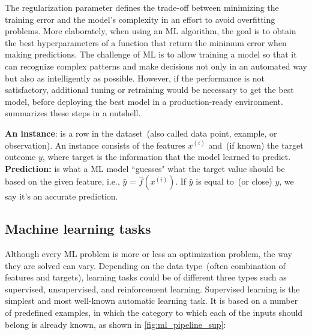 \hspace*{3.5mm} The regularization parameter defines the trade-off between minimizing the training error and the model's complexity in an effort to avoid overfitting problems. More elaborately, when using an ML algorithm, the goal is to obtain the best hyperparameters of a function that return the minimum error when making predictions. 
The challenge of ML is to allow training a model so that it can recognize complex patterns and make decisions not only in an automated way but also as intelligently as possible. 
However, if the performance is not satisfactory, additional tuning or retraining would be necessary to get the best model, before %
deploying the best model in a production-ready environment. 
 summarizes these steps in a nutshell. 

\vspace{2mm}
\begin{tcolorbox}[colback=white!3!white,colframe=gray!120!black,title=\faBook~Data instance and prediction:]
    \scriptsize{
        \textbf{An instance}: is a row in the dataset~(also called data point, example, or observation). An instance consists of the features $x^{(i)}$ and~(if known) the target outcome ${y}$, where target is the information that the model learned to predict. \\
        \textbf{Prediction:} is what a ML model ``guesses" what the target value should be based on the given feature, i.e., $\hat{y}$ = $\hat{f}\left(x^{(i)}\right)$. If $\hat{y}$ is equal to~(or close) ${y}$, we say it's an accurate prediction.   
        }
\end{tcolorbox}

\subsection{Machine learning tasks}
Although every ML problem is more or less an optimization problem, the way they are solved can vary. Depending on the data type~(often combination of features and targets), learning tasks could be of different three types such as supervised, unsupervised, and reinforcement learning. Supervised learning is the simplest and most well-known automatic learning task. It is based on a number of predefined examples, in which the category to which each of the inputs should belong is already known, as shown in \cref{fig:ml_pipeline_sup}:

